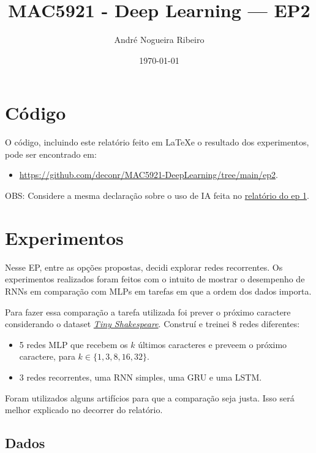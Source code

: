 \documentclass[11pt,a4paper]{article}
\title{MAC5921 - Deep Learning — EP2}
\author{André Nogueira Ribeiro}
\date{\today}
\begin{document}
\maketitle

\section{Código}

O código, incluindo este relatório feito em \LaTeX e o resultado dos experimentos, pode ser encontrado em:
\begin{itemize}
\item \href{https://github.com/deconr/MAC5921-DeepLearning/tree/main/ep2}{https://github.com/deconr/MAC5921-DeepLearning/tree/main/ep2}.
\end{itemize}

OBS: Considere a mesma declaração sobre o uso de IA feita no \href{https://github.com/deconr/MAC5921-DeepLearning/tree/main/ep1/report/report.tex}{relatório do ep 1}.

\section{Experimentos}
Nesse EP, entre as opções propostas, decidi explorar redes recorrentes. Os experimentos realizados foram feitos com o intuito de mostrar o desempenho de RNNs em comparação com MLPs em tarefas em que a ordem dos dados importa.

Para fazer essa comparação a tarefa utilizada foi prever o próximo caractere considerando o dataset \href{https://github.com/karpathy/char-rnn/tree/master/data/tinyshakespeare}{\textit{Tiny Shakespeare}}. Construí e treinei 8 redes diferentes:

\begin{itemize}
    \item 5 redes MLP que recebem os $k$ últimos caracteres e preveem o próximo caractere, para $k \in \{1,3,8,16,32\}$.
    \item 3 redes recorrentes, uma RNN simples, uma GRU e uma LSTM.
\end{itemize}

Foram utilizados alguns artifícios para que a comparação seja justa. Isso será melhor explicado no decorrer do relatório.

\subsection{Dados}
\end{document}
